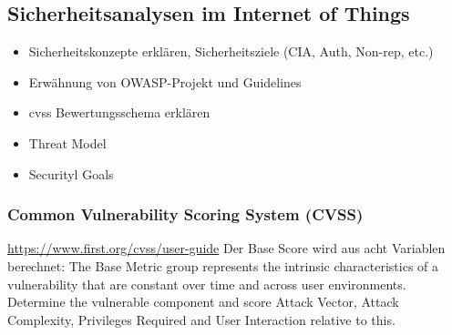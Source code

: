 \subsection{Sicherheitsanalysen im Internet of Things}
\label{sec:sota_sa}
	
	\begin{itemize}
		\item Sicherheitskonzepte erklären, Sicherheitsziele (CIA, Auth, Non-rep, etc.)
		\item Erwähnung von OWASP-Projekt und Guidelines
		\item \gls{cvss} Bewertungsschema erklären
		\item Threat Model
		\item Securityl Goals
	\end{itemize}
	
\subsubsection{Common Vulnerability Scoring System (CVSS)}
\label{sec:sota_sa_cvss}
    \url{https://www.first.org/cvss/user-guide}
    Der Base Score wird aus acht Variablen berechnet:
    The Base Metric group represents the intrinsic characteristics of a vulnerability that are constant over time and across user environments. 
    Determine the vulnerable component and score Attack Vector, Attack Complexity, Privileges Required and User Interaction relative to this.
